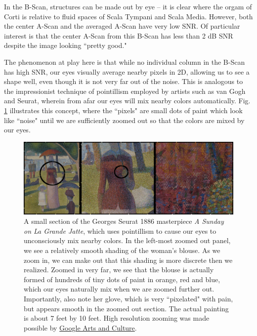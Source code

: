 \documentclass{article}
\begin{document}
\par{In the B-Scan, structures can be made out by eye -- it is clear where the orgam of Corti is relative to fluid spaces of Scala Tympani and Scala Media. However, both the center A-Scan and the averaged A-Scan have very low SNR. Of particular interest is that the center A-Scan from this B-Scan has less than 2 dB SNR despite the image looking ``pretty good."}

\par{The phenomenon at play here is that while no individual column in the B-Scan has high SNR, our eyes visually average nearby pixels in 2D, allowing us to see a shape well, even though it is not very far out of the noise. This is analogous to the impressionist technique of pointillism employed by artists such as van Gogh and Seurat, wherein from afar our eyes will mix nearby colors automatically. Fig. \ref{seurat} illustrates this concept, where the ``pixels" are small dots of paint which look like ``noise" until we are sufficiently zoomed out so that the colors are mixed by our eyes.}

\begin{figure}[h!]
	\centering
	\includegraphics[width=\textwidth]{Data for Probe Writeup/seurat.png}
	\caption{A small section of the Georges Seurat 1886 masterpiece \textit{A Sunday on La Grande Jatte}, which uses pointillism to cause our eyes to unconsciously mix nearby colors. In the left-most zoomed out panel, we see a relatively smooth shading of the woman's blouse. As we zoom in, we can make out that this shading is more discrete then we realized. Zoomed in very far, we see that the blouse is actually formed of hundreds of tiny dots of paint in orange, red and blue, which our eyes naturally mix when we are zoomed further out. Importantly, also note her glove, which is very ``pixelated" with pain, but appears smooth in the zoomed out section. The actual painting is about 7 feet by 10 feet. High resolution zooming was made possible by \href{https://artsandculture.google.com/usergallery/AALi1BhQoIB2IQ}{Google Arts and Culture}.}\label{seurat}
\end{figure}
\end{document}
